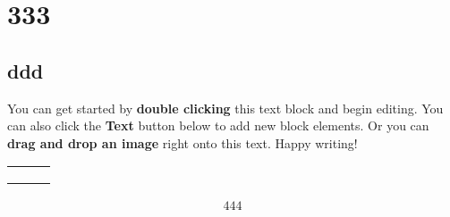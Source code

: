 \chapter{333}
\section{ddd}


You can get started by \textbf{double clicking} this text block and begin editing. You can also click the \textbf{Text} button below to add new block elements. Or you can \textbf{drag and drop an image} right onto this text. Happy writing!
\begin{table} 
    \begin{tabular}{ c c c }
         &  &  \\ 
         &  &  \\ 
         &  &  \\ 
    \end{tabular} 
\end{table}

\begin{align}
444
\end{align}
\wafniuf